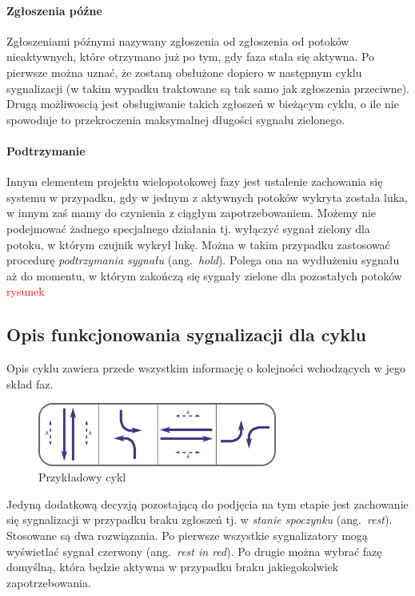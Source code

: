 \documentclass{pracamgr}
\newcommand{\ang}[1]{(ang.~\emph{#1})}
\newcommand{\todo}[1]{\textcolor{red}{#1}}
\theoremstyle{plain}
\begin{document}
\paragraph{Zgłoszenia późne} Zgłoszeniami późnymi nazywany zgłoszenia
od zgłoszenia od potoków nieaktywnych, które otrzymano już po tym, gdy
faza stała się aktywna. Po pierwsze można uznać, że zostaną obsłużone
dopiero w następnym cyklu sygnalizacji (w takim wypadku traktowane są
tak samo jak zgłoszenia przeciwne). Drugą możliwoscią jest
obsługiwanie takich zgłoszeń w bieżącym cyklu, o ile nie spowoduje to
przekroczenia maksymalnej długości sygnału zielonego.

\paragraph{Podtrzymanie} Innym elementem projektu wielopotokowej fazy
jest ustalenie zachowania się systemu w przypadku, gdy w jednym z
aktywnych potoków wykryta została luka, w innym zaś mamy do czynienia
z ciągłym zapotrzebowaniem. Możemy nie podejmować żadnego specjalnego
działania tj. wyłączyć sygnał zielony dla potoku, w którym czujnik
wykrył lukę.  Można w takim przypadku zastosować procedurę
\emph{podtrzymania sygnału} \ang{hold}. Polega ona na wydłużeniu
sygnału aż do momentu, w którym zakończą się sygnały zielone dla
pozostałych potoków \todo{rysunek}

\subsection{Opis funkcjonowania sygnalizacji dla cyklu} Opis cyklu
zawiera przede wszystkim informację o kolejności wchodzących w jego
skład faz.
\begin{figure}[h] \centering
  \includegraphics[width=0.7\textwidth]{img/signals-cycle-example}
  \caption{Przykładowy cykl}
\end{figure}

Jedyną dodatkową decyzją pozostającą do podjęcia na tym etapie jest
zachowanie się sygnalizacji w przypadku braku zgłoszeń tj. w
\emph{stanie spoczynku} \ang{rest}. Stosowane są dwa rozwiązania. Po
pierwsze wszystkie sygnalizatory mogą wyświetlać sygnał czerwony
\ang{rest in red}. Po drugie można wybrać fazę domyślną, która będzie
aktywna w przypadku braku jakiegokolwiek zapotrzebowania.
\end{document}

